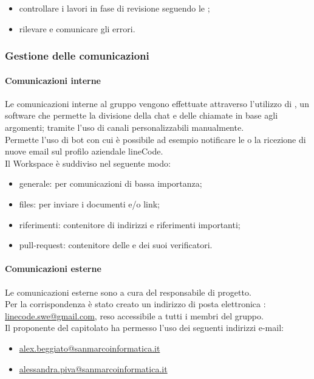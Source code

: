 		\begin{itemize}
			\item controllare i lavori in fase di revisione seguendo le ;
			\item rilevare e comunicare gli errori.
		\end{itemize}
		
		 \subsubsection{Gestione delle comunicazioni}
		 
		 \paragraph{Comunicazioni interne}
		 Le comunicazioni interne al gruppo vengono effettuate attraverso l'utilizzo di , un software che permette la divisione della chat e delle chiamate in base agli argomenti; tramite l'uso di canali personalizzabili manualmente. \\ Permette l'uso di bot con cui è possibile ad esempio notificare le  o la ricezione di nuove email sul profilo aziendale lineCode. \\
		 Il Workspace è suddiviso nel seguente modo:
		 	\begin{itemize}
		 	\item {\ttfamily generale}: per comunicazioni di bassa importanza;
		 	\item {\ttfamily files}: per inviare i documenti e/o link;
		 	\item {\ttfamily riferimenti}: contenitore di indirizzi e riferimenti importanti;
		 	\item {\ttfamily pull-request}: contenitore delle  e dei suoi verificatori.
		 	\end{itemize}
	 
		 \paragraph{Comunicazioni esterne}
		 Le comunicazioni esterne sono a cura del responsabile di progetto. \\
		 Per la corrispondenza è stato creato un indirizzo di posta elettronica : \url{linecode.swe@gmail.com}, reso accessibile a tutti i membri del gruppo.\\
		 Il proponente del capitolato ha  permesso l'uso dei seguenti indirizzi e-mail:
		 \begin{itemize}
		 	\item \url{alex.beggiato@sanmarcoinformatica.it}
		 	\item \url{alessandra.piva@sanmarcoinformatica.it}
		 \end{itemize}
		 
